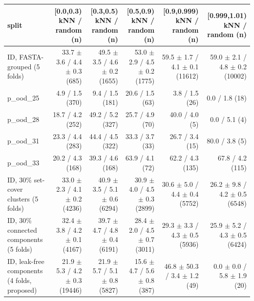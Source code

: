 \begin{tabular}{lrrrrr}
\toprule
split & [0.0,0.3) kNN / random (n) & [0.3,0.5) kNN / random (n) & [0.5,0.9) kNN / random (n) & [0.9,0.999) kNN / random (n) & [0.999,1.01) kNN / random (n) \\ \midrule
ID, FASTA-grouped (5 folds) & 33.7 $\pm$ 3.6 / 4.4 $\pm$ 0.3 (685) & 49.5 $\pm$ 3.5 / 4.6 $\pm$ 0.2 (1655) & 53.0 $\pm$ 2.9 / 4.5 $\pm$ 0.2 (1775) & 59.5 $\pm$ 1.7 / 4.1 $\pm$ 0.1 (11612) & 59.0 $\pm$ 2.1 / 4.8 $\pm$ 0.2 (10002) \\
p\_ood\_25 & 4.9 / 1.5 (370) & 9.4 / 1.5 (181) & 20.6 / 1.5 (63) & 3.8 / 1.5 (26) & 0.0 / 1.8 (18) \\
p\_ood\_28 & 18.7 / 4.2 (252) & 49.2 / 5.2 (327) & 25.7 / 4.9 (70) & 40.0 / 4.0 (5) & 0.0 / 5.1 (4) \\
p\_ood\_31 & 23.3 / 4.4 (283) & 44.4 / 4.5 (322) & 33.3 / 3.7 (33) & 26.7 / 3.4 (15) & 80.0 / 3.8 (5) \\
p\_ood\_33 & 20.2 / 4.3 (168) & 39.3 / 4.6 (168) & 63.9 / 4.1 (72) & 62.2 / 4.3 (135) & 67.8 / 4.2 (115) \\
ID, 30\% set-cover clusters (5 folds) & 33.0 $\pm$ 2.3 / 4.1 $\pm$ 0.2 (4236) & 40.9 $\pm$ 3.5 / 5.1 $\pm$ 0.6 (6294) & 30.9 $\pm$ 4.0 / 4.5 $\pm$ 0.3 (2899) & 30.6 $\pm$ 5.0 / 4.4 $\pm$ 0.4 (5752) & 26.2 $\pm$ 9.8 / 4.2 $\pm$ 0.5 (6548) \\
ID, 30\% connected components (5 folds) & 32.4 $\pm$ 3.8 / 4.2 $\pm$ 0.1 (4167) & 39.7 $\pm$ 4.7 / 4.8 $\pm$ 0.4 (6191) & 28.4 $\pm$ 2.0 / 4.5 $\pm$ 0.7 (3011) & 29.3 $\pm$ 3.3 / 4.3 $\pm$ 0.5 (5936) & 25.9 $\pm$ 5.2 / 4.3 $\pm$ 0.5 (6424) \\
ID, leak-free components (4 folds, proposed) & 21.9 $\pm$ 5.3 / 4.2 $\pm$ 0.3 (19446) & 21.9 $\pm$ 5.7 / 5.1 $\pm$ 0.8 (5827) & 15.6 $\pm$ 4.7 / 5.6 $\pm$ 0.8 (387) & 46.8 $\pm$ 50.3 / 3.4 $\pm$ 1.2 (49) & 0.0 $\pm$ 0.0 / 5.8 $\pm$ 1.9 (20) \\
\bottomrule
\end{tabular}
